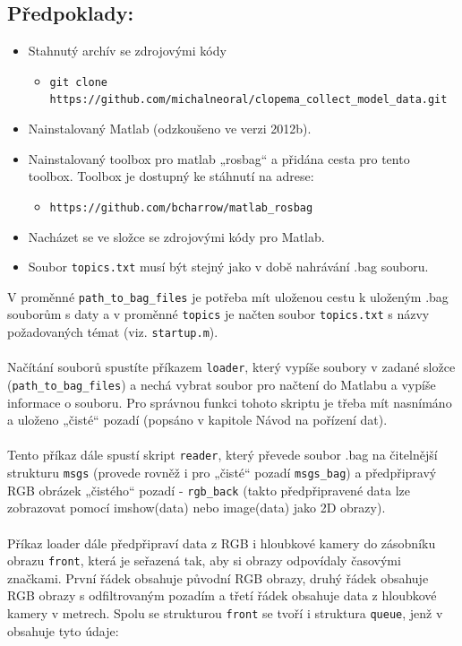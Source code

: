 \documentclass[10pt,a4paper,titlepage,oneside]{book}
\begin{document}
\subsection*{Předpoklady:}
\begin{itemize}
   \item Stahnutý archív se zdrojovými kódy
  \begin{itemize}
  	\item \verb|git clone https://github.com/michalneoral/clopema_collect_model_data.git|
  \end{itemize}
  
  \item Nainstalovaný Matlab (odzkoušeno ve verzi 2012b).
  \item Nainstalovaný toolbox pro matlab „rosbag“ a přidána cesta pro tento toolbox. Toolbox je dostupný ke stáhnutí na adrese:
  \begin{itemize}
     \item \verb|https://github.com/bcharrow/matlab_rosbag|
  \end{itemize}
  \item Nacházet se ve složce se zdrojovými kódy pro Matlab.
  \item Soubor \verb|topics.txt| musí být stejný jako v době nahrávání .bag souboru.
\end{itemize}

V proměnné \verb|path_to_bag_files| je potřeba mít uloženou cestu k uloženým .bag souborům s daty a v proměnné \verb|topics| je načten soubor \verb|topics.txt| s názvy požadovaných témat (viz. \verb|startup.m|).\\
\\
Načítání souborů spustíte příkazem \verb|loader|, který vypíše soubory v zadané složce (\verb|path_to_bag_files|) a nechá vybrat soubor pro načtení do Matlabu a vypíše informace o souboru. Pro správnou funkci tohoto skriptu je třeba mít nasnímáno a uloženo „čisté“ pozadí (popsáno v kapitole Návod na pořízení dat).\\
\\
Tento příkaz dále spustí skript \verb|reader|, který převede soubor .bag na čitelnější strukturu \verb|msgs| (provede rovněž i pro „čisté“ pozadí \verb|msgs_bag|) a předpřipravý RGB obrázek „čistého“ pozadí - \verb|rgb_back| (takto předpřipravené data lze zobrazovat pomocí imshow(data) nebo image(data) jako 2D obrazy). \\
\\
Příkaz loader dále předpřipraví data z RGB i hloubkové kamery do zásobníku obrazu \verb|front|, která je seřazená tak, aby si obrazy odpovídaly časovými značkami. První řádek obsahuje původní RGB obrazy, druhý řádek obsahuje RGB obrazy s odfiltrovaným pozadím a třetí řádek obsahuje data z hloubkové kamery v metrech.
Spolu se strukturou \verb|front| se tvoří i struktura \verb|queue|, jenž v obsahuje tyto údaje:
\end{document}
